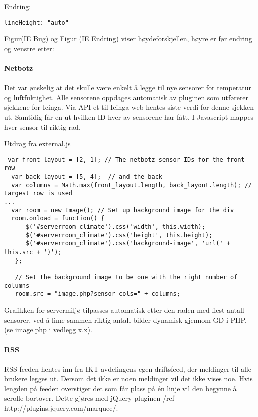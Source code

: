 Endring:

\begin{lstlisting}
lineHeight: "auto"
\end{lstlisting}

Figur(IE Bug) og Figur (IE Endring)  viser høydeforskjellen, høyre er før endring og venstre etter:

\paragraph{Netbotz}

Det var ønskelig at det skulle være enkelt å legge til nye sensorer for temperatur og luftfuktighet. Alle sensorene oppdages automatisk av pluginen som utførerer sjekkene for Icinga. Via API-et til Icinga-web hentes siste verdi for denne sjekken ut. Samtidig får en ut hvilken ID hver av sensorene har fått. I Javascript mappes hver sensor til riktig rad.

Utdrag fra external.js
\begin{lstlisting}
 var front_layout = [2, 1]; // The netbotz sensor IDs for the front row
  var back_layout = [5, 4];  // and the back
  var columns = Math.max(front_layout.length, back_layout.length); // Largest row is used 
...
  var room = new Image(); // Set up background image for the div
  room.onload = function() {
      $('#serverroom_climate').css('width', this.width);
      $('#serverroom_climate').css('height', this.height);
      $('#serverroom_climate').css('background-image', 'url(' + this.src + ')');
   };

   // Set the background image to be one with the right number of columns
   room.src = "image.php?sensor_cols=" + columns;
\end{lstlisting}

Grafikken for servermiljø tilpasses automatisk etter den raden med flest antall sensorer, ved å lime sammen riktig antall bilder dynamisk gjennom GD i PHP. (se image.php i vedlegg x.x).

\paragraph{RSS}

RSS-feeden hentes inn fra IKT-avdelingens egen driftsfeed, der meldinger til alle brukere legges ut. Dersom det ikke er noen meldinger vil det ikke vises noe. Hvis lengden på feeden overstiger det som får plass på én linje vil den begynne å scrolle bortover. Dette gjøres med jQuery-pluginen /ref http://plugins.jquery.com/marquee/.

